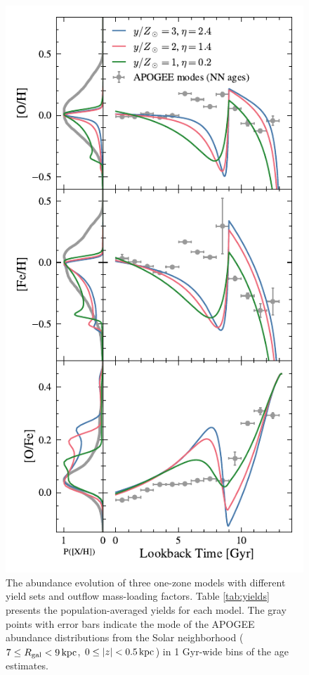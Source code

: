 \documentclass[twocolumn,twocolappendix,linenumbers]{aastex631}
\begin{document}
\begin{figure}
    \centering
    \includegraphics{figures/yield_outflow.pdf}
    \caption{The abundance evolution of three one-zone models with different yield sets and outflow mass-loading factors. Table \ref{tab:yields} presents the population-averaged yields for each model. The gray points with error bars indicate the mode of the APOGEE abundance distributions from the Solar neighborhood ($7\leq R_{\rm gal}<9\,{\rm kpc}$, $0\leq|z|<0.5\,{\rm kpc}$) in 1 Gyr-wide bins of the \citet{leung_variational_2023} age estimates.}
    \label{fig:yield-outflow}
\end{figure}
\end{document}
